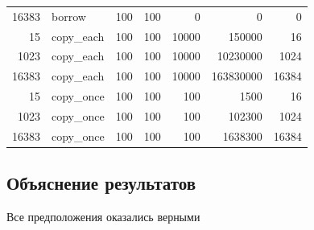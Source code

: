 \documentclass[a4paper,12pt]{extarticle}
\begin{document}
\begin{table}[h]
\begin{tabular}{|r|l|r|r|r|r|r|}
			16383  & borrow     & 100      & 100 & 0     & 0         & 0     \\
			15     & copy\_each & 100      & 100 & 10000 & 150000    & 16    \\
			1023   & copy\_each & 100      & 100 & 10000 & 10230000  & 1024  \\
			16383  & copy\_each & 100      & 100 & 10000 & 163830000 & 16384 \\
			15     & copy\_once & 100      & 100 & 100  & 1500      & 16    \\
			1023   & copy\_once & 100      & 100 & 100  & 102300    & 1024  \\
			16383  & copy\_once & 100      & 100 & 100  & 1638300   & 16384 \\
			\hline
		\end{tabular}
	\end{table}
	
	\subsection*{Объяснение результатов}
	Все предположения оказались верными
\end{document}

